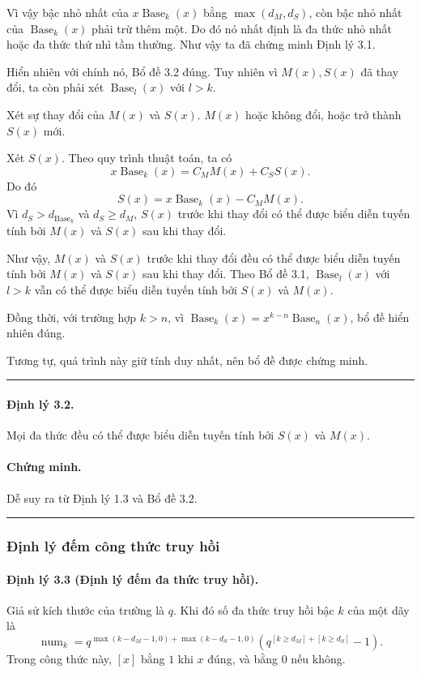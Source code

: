 \documentclass[11pt]{article}
\newcommand{\Base}{\operatorname{Base}}
\newcommand{\num}{\operatorname{num}}
\newcommand{\qedmark}{\hfill\rule{0.7ex}{0.7ex}}
\begin{document}
Vì vậy bậc nhỏ nhất của \(x\Base_k(x)\) bằng \(\max(d_M,d_S)\), còn bậc nhỏ
nhất của \(\Base_k(x)\) phải trừ thêm một. Do đó nó nhất định là đa thức nhỏ
nhất hoặc đa thức thứ nhì tầm thường. Như vậy ta đã chứng minh Định lý 3.1.

Hiển nhiên với chính nó, Bổ đề 3.2 đúng. Tuy nhiên vì \(M(x),S(x)\) đã thay
đổi, ta còn phải xét \(\Base_l(x)\) với \(l>k\).

Xét sự thay đổi của \(M(x)\) và \(S(x)\). \(M(x)\) hoặc không đổi, hoặc trở
thành \(S(x)\) mới.

Xét \(S(x)\). Theo quy trình thuật toán, ta có
\[
  x\Base_k(x)=C_MM(x)+C_SS(x).
\]
Do đó
\[
  S(x)=x\Base_k(x)-C_MM(x).
\]
Vì \(d_S>d_{\Base_k}\) và \(d_S\ge d_M\), \(S(x)\) trước khi thay đổi có thể
được biểu diễn tuyến tính bởi \(M(x)\) và \(S(x)\) sau khi thay đổi.

Như vậy, \(M(x)\) và \(S(x)\) trước khi thay đổi đều có thể được biểu diễn
tuyến tính bởi \(M(x)\) và \(S(x)\) sau khi thay đổi. Theo Bổ đề 3.1,
\(\Base_l(x)\) với \(l>k\) vẫn có thể được biểu diễn tuyến tính bởi \(S(x)\) và
\(M(x)\).

Đồng thời, với trường hợp \(k>n\), vì \(\Base_k(x)=x^{k-n}\Base_n(x)\), bổ đề
hiển nhiên đúng.

Tương tự, quá trình này giữ tính duy nhất, nên bổ đề được chứng minh.
\qedmark

\paragraph{Định lý 3.2.}
Mọi đa thức đều có thể được biểu diễn tuyến tính bởi \(S(x)\) và \(M(x)\).

\paragraph{Chứng minh.}
Dễ suy ra từ Định lý 1.3 và Bổ đề 3.2. \qedmark

\subsubsection{Định lý đếm công thức truy hồi}

\paragraph{Định lý 3.3 (Định lý đếm đa thức truy hồi).}
Giả sử kích thước của trường là \(q\). Khi đó số đa thức truy hồi bậc \(k\) của
một dãy là
\[
  \num_k=
  q^{\max(k-d_M-1,0)+\max(k-d_S-1,0)}
  \left(q^{[k\ge d_M]+[k\ge d_S]}-1\right).
\]
Trong công thức này, \([x]\) bằng \(1\) khi \(x\) đúng, và bằng \(0\) nếu
không.
\end{document}
